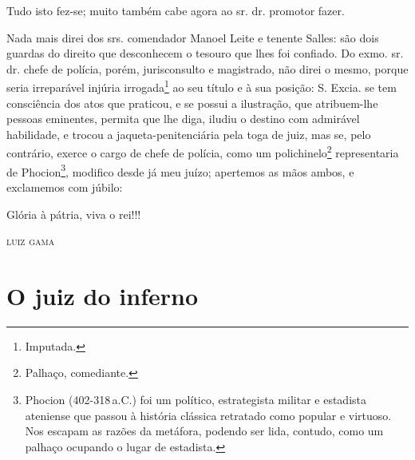 Tudo isto fez-se; muito também cabe agora ao sr. dr. promotor fazer.

Nada mais direi dos srs. comendador Manoel Leite e tenente Salles: são
dois guardas do direito que desconhecem o tesouro que lhes foi confiado.
Do exmo. sr. dr. chefe de polícia, porém, jurisconsulto e magistrado,
não direi o mesmo, porque seria irreparável injúria irrogada\footnote{
  Imputada.} ao seu título e à sua posição: S. Excia. se tem consciência
dos atos que praticou, e se possui a ilustração, que atribuem-lhe
pessoas eminentes, permita que lhe diga, iludiu o destino com admirável
habilidade, e trocou a jaqueta-penitenciária pela toga de juiz, mas se,
pelo contrário, exerce o cargo de chefe de polícia, como um
polichinelo\footnote{ Palhaço, comediante.} representaria de
Phocion\footnote{ Phocion (402-318\,a.C.) foi um político,
  estrategista militar e estadista ateniense que passou à história
  clássica retratado como popular e virtuoso. Nos escapam as razões da
  metáfora, podendo ser lida, contudo, como um palhaço ocupando o lugar
  de estadista.}, modifico desde já meu juízo; apertemos as mãos ambos,
e exclamemos com júbilo:

Glória à pátria, viva o rei!!!

\begin{flushright}
\textsc{luiz gama}
\end{flushright}


\part{O juiz do inferno}

